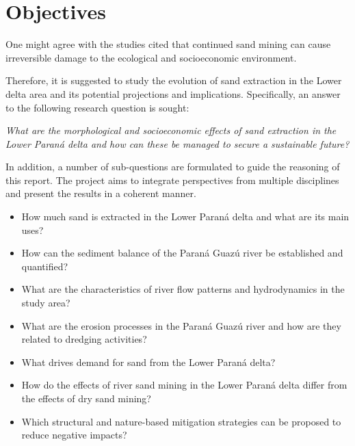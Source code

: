 \section{Objectives}


One might agree with the studies cited that continued sand mining can cause irreversible damage to the ecological and socioeconomic environment. 

Therefore, it is suggested to study the evolution of sand extraction in the Lower delta area and its potential projections and implications. Specifically, an answer to the following research question is sought:

\textit{What are the morphological and socioeconomic effects of sand extraction in the Lower Paraná delta and how can these be managed to secure a sustainable future?}

In addition, a number of sub-questions are formulated to guide the reasoning of this report. The project aims to integrate perspectives from multiple disciplines and present the results in a coherent manner.

\begin{itemize} 
    \item How much sand is extracted in the Lower Paraná delta and what are its main uses?
    \item How can the sediment balance of the Paraná Guazú river be established and quantified?
    \item What are the characteristics of river flow patterns and hydrodynamics in the study area?
    \item What are the erosion processes in the Paraná Guazú river and how are they related to dredging activities?
    \item What drives demand for sand from the Lower Paraná delta?
    \item How do the effects of river sand mining in the Lower Paraná delta differ from the effects of dry sand mining?
    \item Which structural and nature-based mitigation strategies can be proposed to reduce negative impacts?
\end{itemize}

